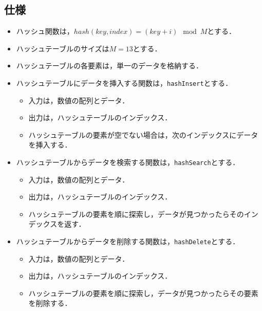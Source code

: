 \documentclass{ltjsarticle}
\begin{document}
\subsection{仕様}
\begin{itemize}
  \item ハッシュ関数は，$hash(key, index) = (key + i) \mod M$とする．
  \item ハッシュテーブルのサイズは$M = 13$とする．
  \item ハッシュテーブルの各要素は，単一のデータを格納する．
  \item ハッシュテーブルにデータを挿入する関数は，\texttt{hashInsert}とする．
  \begin{itemize}
    \item 入力は，数値の配列とデータ．
    \item 出力は，ハッシュテーブルのインデックス．
    \item ハッシュテーブルの要素が空でない場合は，次のインデックスにデータを挿入する．
  \end{itemize}
  \item ハッシュテーブルからデータを検索する関数は，\texttt{hashSearch}とする．
  \begin{itemize}
    \item 入力は，数値の配列とデータ．
    \item 出力は，ハッシュテーブルのインデックス．
    \item ハッシュテーブルの要素を順に探索し，データが見つかったらそのインデックスを返す．
  \end{itemize}
  \item ハッシュテーブルからデータを削除する関数は，\texttt{hashDelete}とする．
  \begin{itemize}
    \item 入力は，数値の配列とデータ．
    \item 出力は，ハッシュテーブルのインデックス．
    \item ハッシュテーブルの要素を順に探索し，データが見つかったらその要素を削除する．
  \end{itemize}
\end{itemize}
\end{document}
